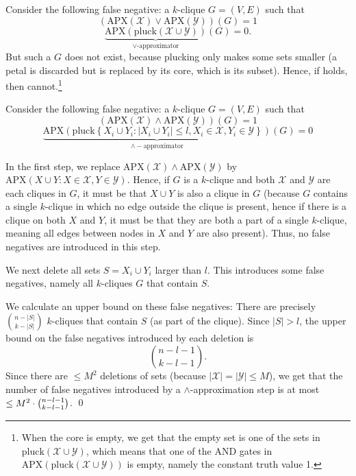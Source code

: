 \case{$\lor$} Consider the following false negative: a $k$-clique $G = (V, E)$ such that 
\begin{equation} \label{eq:or_case_1}
(\text{APX}(\mathcal{X}) \vee \text{APX}(\mathcal{Y}))(G) = 1
\end{equation}
\begin{equation} \label{eq:or_case_2}
\underbrace{
\text{APX}(\text{pluck}(\mathcal{X} \cup \mathcal{Y}))}_{\text{$\lor$-approximator}}(G) = 0.
\end{equation}
But such a $G$ does not exist, because plucking only makes some sets smaller (a petal is discarded but is replaced by its core, which is its subset). Hence,
if  holds, then  cannot.\footnote{When the core is empty, we get that the empty set is one of the sets in $\text{pluck}(\mathcal{X} \cup \mathcal{Y})$, which means that one of the AND gates in $\text{APX}(\text{pluck}(\mathcal{X} \cup \mathcal{Y}))$ is empty, namely the constant truth value 1.}
\medskip 

\noindent\case{$\land$}
Consider the following false negative: 
a $k$-clique $G = (V, E)$ such that
\begin{equation} \label{eq:lambda_case_1}
(\text{APX}(\mathcal{X}) \wedge \text{APX}(\mathcal{Y}))(G) = 1
\end{equation}
\begin{equation} \label{eq:lambda_case_2}
\underbrace{\text{APX} \left( \text{pluck} \left\{ X_i \cup Y_i : |X_i \cup Y_i| \leq l, X_i \in \mathcal{X}, Y_i \in \mathcal{Y} \right\} \right)}_{\land-\text{approximator}} (G)= 0
\end{equation}

In the first step, we replace $\text{APX}(\mathcal{X}) \wedge \text{APX}(\mathcal{Y})$ by $\text{APX}(X \cup Y : X \in \mathcal{X}, Y \in \mathcal Y)$. 
Hence, if $G$ is a $k$-clique and both $\mathcal{X}$ and $\mathcal{Y}$ are each cliques in $G$, it must be that $X \cup Y$ is also a clique in $G$ (because $G$ contains a single $k$-clique in which no edge outside the clique is present, hence if there is a clique on both $X$ and $Y$, it must be that they are both a part of a single $k$-clique, meaning all edges between nodes in $X$ and $Y$ are also present). Thus, no false negatives are introduced in this step.

\bigskip 

We next delete all sets $S=X_i \cup Y_i$ larger than $l$. This introduces some false negatives, namely all $k$-cliques $G$ that contain $S$. 

We calculate an upper bound on these false negatives: There are precisely
$\binom{n - |S|}{k - |S|}$
$k$-cliques that contain $S$ (as part of the clique). Since $|S| > l$, the upper bound on the false negatives introduced by each deletion is
\[
\binom{n - l - 1}{k - l - 1}.
\]
Since there are $\leq M^2$ deletions of sets (because $|\mathcal X| = |\mathcal Y| \le  M$), we get that the number of false negatives introduced by a $\land$-approximation step is at most $\leq M^2 \cdot\binom{n - l - 1}{k - l - 1}$.
\mbox{}\qed

  
 \SetWatermarkText{}

